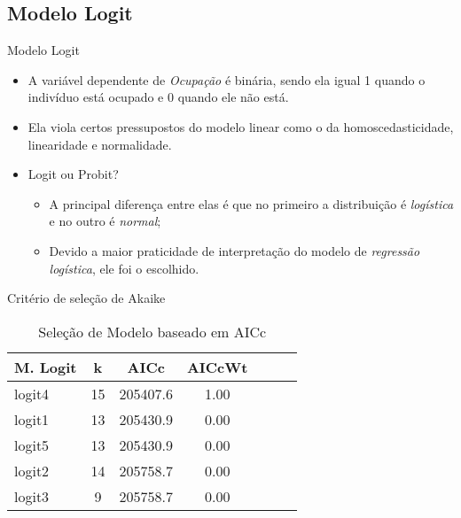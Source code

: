 \documentclass[xcolor={dvipsnames}]{beamer}
\begin{document}
\subsection{Modelo Logit}
\begin{frame}{Modelo Logit}
    \begin{itemize}
        \item A variável dependente de \textit{Ocupação} é binária, sendo ela igual 1 quando o indivíduo está ocupado e 0 quando ele não está.
        \item Ela viola certos pressupostos do modelo linear como o da homoscedasticidade, linearidade e normalidade.
        \item Logit ou Probit?
        \begin{itemize}
            \item A principal diferença entre elas é que no primeiro a distribuição é \textit{logística} e no outro é \textit{normal};
            \item Devido a maior praticidade de interpretação do modelo de \textit{regressão logística}, ele foi o escolhido.
        \end{itemize}
    \end{itemize}    
\end{frame}


\begin{frame}{Critério de seleção de Akaike}
\begin{table}[H]
    \caption{Seleção de Modelo baseado em AICc}
    \centering
    \begin{tabular}{l|c|ccccc}\hline
    M. Logit& k  & AICc     & AICcWt\\\hline
    logit4  & 15 & 205407.6 & 1.00\\
    logit1  & 13 & 205430.9 & 0.00\\
    logit5  & 13 & 205430.9 & 0.00\\
    logit2  & 14 & 205758.7 & 0.00\\
    logit3  &  9 & 205758.7 & 0.00\\\hline
    \end{tabular}
\end{table}
\end{frame}
\end{document}
